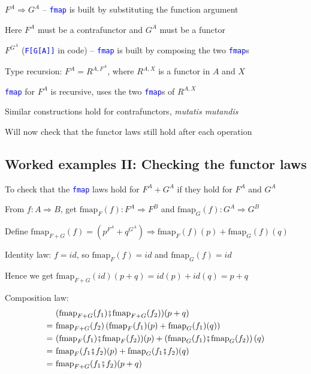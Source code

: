 $F^{A}\Rightarrow G^{A}$ – \texttt{\textcolor{blue}{\footnotesize{}fmap}}
is built by substituting the function argument

Here $F^{A}$ must be a contrafunctor and $G^{A}$ must be a functor

$F^{G^{A}}$ (\texttt{\textcolor{blue}{\footnotesize{}F{[}G{[}A{]}{]}}}
in code) – \texttt{\textcolor{blue}{\footnotesize{}fmap}} is built
by composing the two \texttt{\textcolor{blue}{\footnotesize{}fmap}}s

Type recursion: $F^{A}=R^{A,F^{A}}$, where $R^{A,X}$ is a functor
in $A$ and $X$

\texttt{\textcolor{blue}{\footnotesize{}fmap}} for $F^{A}$ is recursive,
uses the two \texttt{\textcolor{blue}{\footnotesize{}fmap}}s of $R^{A,X}$

Similar constructions hold for contrafunctors, \emph{mutatis mutandis}

Will now check that the functor laws still hold after each operation


\subsection{Worked examples II: Checking the functor laws}

To check that the \texttt{\textcolor{blue}{\footnotesize{}fmap}} laws
hold for $F^{A}+G^{A}$ if they hold for $F^{A}$ and $G^{A}$

From $f:A\Rightarrow B$, get $\text{fmap}_{F}(f):F^{A}\Rightarrow F^{B}$
and $\text{fmap}_{G}(f):G^{A}\Rightarrow G^{B}$

Define $\text{fmap}_{F+G}(f)=(p^{F^{A}}+q^{G^{A}})\Rightarrow\text{fmap}_{F}(f)(p)+\text{fmap}_{G}(f)(q)$

Identity law: $f=id$, so $\text{fmap}_{F}(f)=id$ and $\text{fmap}_{G}(f)=id$

Hence we get $\text{fmap}_{F+G}(id)(p+q)=id(p)+id(q)=p+q$

Composition law: 
\begin{align*}
 & (\text{fmap}_{F+G}(f_{1})\bef\text{fmap}_{F+G}(f_{2}))(p+q)\\
=\  & \text{fmap}_{F+G}(f_{2})\left(\text{fmap}_{F}(f_{1})(p)+\text{fmap}_{G}(f_{1})(q)\right)\\
=\  & (\text{fmap}_{F}(f_{1})\bef\text{fmap}_{F}(f_{2}))(p)+\left(\text{fmap}_{G}(f_{1})\bef\text{fmap}_{G}(f_{2})\right)(q)\\
=\  & \text{fmap}_{F}(f_{1}\bef f_{2})(p)+\text{fmap}_{G}(f_{1}\bef f_{2})(q)\\
=\  & \text{fmap}_{F+G}(f_{1}\bef f_{2})(p+q)
\end{align*}

